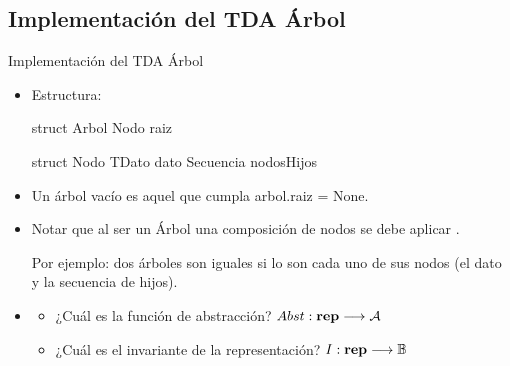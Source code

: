 \documentclass[10pt,envcountsect,spanish]{beamer}
\begin{document}
\subsection{Implementación del TDA Árbol}

\begin{frame}[fragile]{Implementación del TDA Árbol}

\begin{itemize}


\item Estructura:

\hfil
\begin{minipage}{.3\textwidth}
\begin{pyverbatim}
struct Arbol
   Nodo raiz
\end{pyverbatim}
\end{minipage}
\begin{minipage}{.65\textwidth}
\begin{pyverbatim}
struct Nodo 
   TDato dato
   Secuencia nodosHijos
\end{pyverbatim}
\end{minipage}\/


\item Un árbol vacío es aquel que cumpla arbol.raiz = None.

\item Notar que al ser un Árbol una composición de nodos se debe aplicar .

Por ejemplo: dos árboles son iguales si lo son cada uno de sus nodos (el dato y la secuencia de hijos).

\item {}
\begin{itemize}
\item ¿Cuál es la función de abstracción? $Abst: \mbox{\textbf{rep}} \longrightarrow {\cal A}$

\item ¿Cuál es el invariante de la representación? $I: \mbox{\textbf{rep}} \longrightarrow \mathbb{B}$

\end{itemize}

\end{itemize}

\end{frame}
\end{document}
